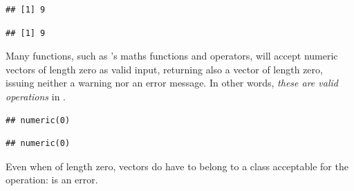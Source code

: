 \documentclass[krantz2]{krantz}\usepackage{knitr}
\begin{document}
\begin{explainbox}
\begin{knitrout}\footnotesize
{}\color{fgcolor}\begin{kframe}
\begin{alltt}
\hlstd{(} \hlstd{(}
\end{alltt}
\begin{verbatim}
## [1] 9
\end{verbatim}
\begin{alltt}
\hlstd{(}
\end{alltt}
\begin{verbatim}
## [1] 9
\end{verbatim}
\end{kframe}
\end{knitrout}

Many functions, such as \Rlang's maths functions and operators, will accept numeric vectors of length zero as valid input, returning also a vector of length zero, issuing neither a warning nor an error message. In other words, \emph{these are valid operations} in \Rlang.

\begin{knitrout}\footnotesize
{}\color{fgcolor}\begin{kframe}
\begin{alltt}
\hlstd{(}\hlstd{(}\hlstd{))}
\end{alltt}
\begin{verbatim}
## numeric(0)
\end{verbatim}
\begin{alltt}
 \hlopt{+} \hlstd{(}\hlstd{)}
\end{alltt}
\begin{verbatim}
## numeric(0)
\end{verbatim}
\end{kframe}
\end{knitrout}

Even when of length zero, vectors do have to belong to a class acceptable for the operation:  is an error.

\end{explainbox}
\end{document}
